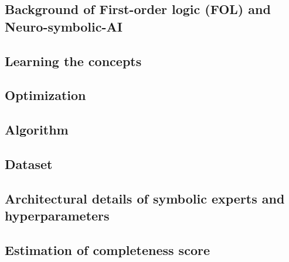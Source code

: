 \documentclass[nohyperref]{article}
\theoremstyle{plain}
\theoremstyle{definition}
\theoremstyle{remark}
\begin{document}
\subsection{Background of First-order logic (FOL) and Neuro-symbolic-AI}
\label{app:FOL}



\subsection{Learning the concepts}
\label{app:concept_learning}



\subsection{Optimization}
\label{app:loss}


\subsection{Algorithm}
\label{app:algo}


\subsection{Dataset}
\label{app:dataset}


\subsection{Architectural details of symbolic experts and hyperparameters}
\label{app:g}


\subsection{Estimation of completeness score}
\label{app:completeness}

\end{document}
